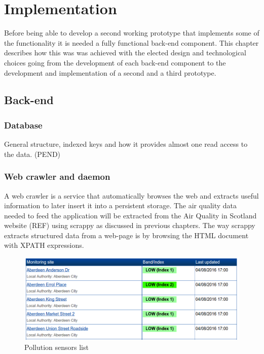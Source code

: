 \chapter{Implementation}
Before being able to develop a second working prototype that implements some of the functionality it is needed a fully functional back-end component. This chapter describes how this was was achieved with the elected design and technological choices going from the development of each back-end component to the development and implementation of a second and a third prototype.
\section{Back-end}

\subsection{Database}
General structure, indexed keys and how it provides almost one read access to the data. 
(PEND)

\subsection{Web crawler and daemon}
A web crawler is a service that automatically browses the web and extracts useful information to later insert it into a persistent storage. The air quality data needed to feed the application will be extracted from the Air Quality in Scotland website (REF) using scrappy as discussed in previous chapters. The way scrappy extracts structured data from a web-page is by browsing the HTML document with XPATH expressions. 

\begin{figure}[H]
\begin{adjustbox}{width=.5\textwidth,center=\textwidth}
  \centering
  \includegraphics[scale=1]{images/monitoring_summary.png}
\end{adjustbox}
  \caption[Pollution sensors list]{Pollution sensors list \footnotemark}
  \label{fig:pollution_sensors_list}
\end{figure}

